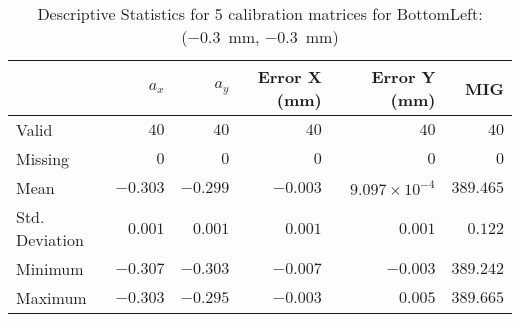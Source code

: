 \begin{table}[h]
    \begin{subtable}{\textwidth}
        \centering
        \footnotesize
        \begin{tabular}{lrrrrr}
            \toprule
                & $a_x$ & $a_y$ & Error X (mm) & Error Y (mm) & MIG  \\
            \midrule
            Valid & $40$ & $40$ & $40$ & $40$ & $40$  \\
            Missing & $0$ & $0$ & $0$ & $0$ & $0$  \\
            Mean & $-0.303$ & $-0.299$ & $-0.003$ & $9.097\times10^{-4}$ & $389.465$  \\
            Std. Deviation & $0.001$ & $0.001$ & $0.001$ & $0.001$ & $0.122$  \\
            Minimum & $-0.307$ & $-0.303$ & $-0.007$ & $-0.003$ & $389.242$  \\
            Maximum & $-0.303$ & $-0.295$ & $-0.003$ & $0.005$ & $389.665$  \\
            \bottomrule
        \end{tabular}
        \caption{$T_{Avg}$}
        \end{subtable}

    \caption{Descriptive Statistics for 5 calibration matrices for \textsf{BottomLeft:} (\SI{-0.3}{\milli\meter}, \SI{-0.3}{\milli\meter})}
    \label{table:stats_matrix_bottomleft}
\end{table}

